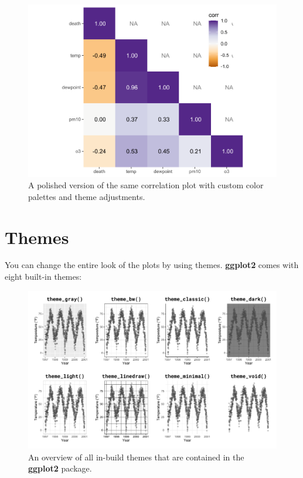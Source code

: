 \documentclass[
]{krantz}
\begin{document}
\begin{figure}
\centering
\includegraphics{bookdown_files/figure-latex/tile-corr-plot-polished-1.pdf}
\caption{\label{fig:tile-corr-plot-polished}A polished version of the same correlation plot with custom color palettes and theme adjustments.}
\end{figure}

\hypertarget{themes}{%
\chapter{Themes}\label{themes}}

You can change the entire look of the plots by using themes. \textbf{ggplot2} comes with eight built-in themes:

\begin{figure}
\centering
\includegraphics{bookdown_files/figure-latex/ggplot2-theme-gallery-1.pdf}
\caption{\label{fig:ggplot2-theme-gallery}An overview of all in-build themes that are contained in the \textbf{ggplot2} package.}
\end{figure}
\end{document}

